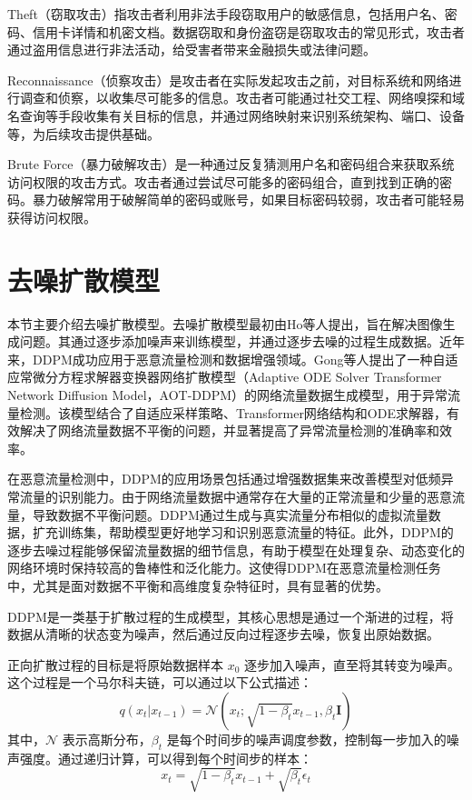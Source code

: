 \documentclass[promaster]{thesis-uestc}
\begin{document}
Theft（窃取攻击）指攻击者利用非法手段窃取用户的敏感信息，包括用户名、密码、信用卡详情和机密文档。数据窃取和身份盗窃是窃取攻击的常见形式，攻击者通过盗用信息进行非法活动，给受害者带来金融损失或法律问题。

Reconnaissance（侦察攻击）是攻击者在实际发起攻击之前，对目标系统和网络进行调查和侦察，以收集尽可能多的信息。攻击者可能通过社交工程、网络嗅探和域名查询等手段收集有关目标的信息，并通过网络映射来识别系统架构、端口、设备等，为后续攻击提供基础。

Brute Force（暴力破解攻击）是一种通过反复猜测用户名和密码组合来获取系统访问权限的攻击方式。攻击者通过尝试尽可能多的密码组合，直到找到正确的密码。暴力破解常用于破解简单的密码或账号，如果目标密码较弱，攻击者可能轻易获得访问权限。

\section{去噪扩散模型}
本节主要介绍去噪扩散模型。去噪扩散模型最初由Ho等人提出，旨在解决图像生成问题。其通过逐步添加噪声来训练模型，并通过逐步去噪的过程生成数据。近年来，DDPM成功应用于恶意流量检测和数据增强领域。Gong等人提出了一种自适应常微分方程求解器变换器网络扩散模型（Adaptive ODE Solver Transformer Network Diffusion Model，AOT-DDPM）的网络流量数据生成模型，用于异常流量检测。该模型结合了自适应采样策略、Transformer网络结构和ODE求解器，有效解决了网络流量数据不平衡的问题，并显著提高了异常流量检测的准确率和效率。

在恶意流量检测中，DDPM的应用场景包括通过增强数据集来改善模型对低频异常流量的识别能力。由于网络流量数据中通常存在大量的正常流量和少量的恶意流量，导致数据不平衡问题。DDPM通过生成与真实流量分布相似的虚拟流量数据，扩充训练集，帮助模型更好地学习和识别恶意流量的特征。此外，DDPM的逐步去噪过程能够保留流量数据的细节信息，有助于模型在处理复杂、动态变化的网络环境时保持较高的鲁棒性和泛化能力。这使得DDPM在恶意流量检测任务中，尤其是面对数据不平衡和高维度复杂特征时，具有显著的优势。

DDPM是一类基于扩散过程的生成模型，其核心思想是通过一个渐进的过程，将数据从清晰的状态变为噪声，然后通过反向过程逐步去噪，恢复出原始数据。


正向扩散过程的目标是将原始数据样本 \( x_0 \) 逐步加入噪声，直至将其转变为噪声。这个过程是一个马尔科夫链，可以通过以下公式描述：
\begin{equation}
q(x_t | x_{t-1}) = \mathcal{N}(x_t; \sqrt{1 - \beta_t} x_{t-1}, \beta_t \mathbf{I})
\end{equation}
其中，\( \mathcal{N} \) 表示高斯分布，\( \beta_t \) 是每个时间步的噪声调度参数，控制每一步加入的噪声强度。通过递归计算，可以得到每个时间步的样本：
\begin{equation}
x_t = \sqrt{1 - \beta_t} x_{t-1} + \sqrt{\beta_t} \epsilon_t
\end{equation}
\end{document}
